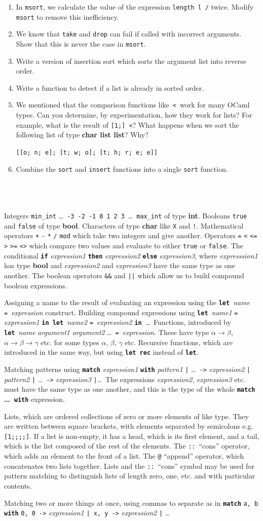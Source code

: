 \documentclass[]{book}
\makeatletter
\newcommand\upquote[1]{\textquotesingle#1\textquotesingle}
\newcommand{\sofarstartingoff}{

\noindent 1

\noindent Integers \texttt{min\_int} \ldots\ \texttt{-3}\ \texttt{-2}\ \texttt{-1}\ \texttt{0}\ \texttt{1}\ \texttt{2}\ \texttt{3}\ \ldots\ \texttt{max\_int} of type \textbf{\textrm{int}}. Booleans \texttt{true} and \texttt{false} of type \textbf{\textrm{bool}}. \noindent Characters of type \textrm{\textbf{char}} like \texttt{\upquote{X}} and \texttt{\upquote{!}}. Mathematical operators \texttt{+} \texttt{-} \texttt{*} \texttt{/} \texttt{mod} which take two integers and give another. Operators \texttt{=} \texttt{<} \texttt{<=} \texttt{>} \texttt{>=} \texttt{<>} which compare two values and evaluate to either \texttt{true} or \texttt{false}. The conditional \textbf{\texttt{if}} \textit{expression1} \textbf{\texttt{then}} \textit{expression2} \textbf{\texttt{else}} \textit{expression3}, where \textit{expresssion1} has type \textrm{\textbf{bool}} and \textit{expression2} and \textit{expression3} have the same type as one another. The boolean operators \texttt{\&\&} and \texttt{||} which allow us to build compound boolean expressions.}
\newcommand{\sofarfunctions}
{
\noindent 2

\noindent Assigning a name to the result of evaluating an expression using the \textbf{\texttt{let}}\ \textit{name} \texttt{=}\ \textit{expression} construct. Building compound expressions using \textbf{\texttt{let}}\ \textit{name1} \texttt{=} \textit{expression1} \textbf{\texttt{in}}\ \textbf{\texttt{let}}\ \textit{name2} \texttt{=}\ \textit{expression2} \textbf{\texttt{in}}\ \ldots \ Functions, introduced by \textbf{\texttt{let}}\ \textit{name} \textit{argument1} \textit{argument2} \ldots\ \texttt{=}\ \textit{expression}. These have type $\alpha \rightarrow \beta$, $\alpha \rightarrow \beta \rightarrow \gamma$ etc. for some types $\alpha$, $\beta$, $\gamma$ etc. Recursive functions, which are introduced in the same way, but using \textbf{\texttt{let rec}} instead of \textbf{\texttt{let}}.}
\newcommand{\sofarcasebycase}
{\noindent 3

\noindent Matching patterns using \textbf{\texttt{match}} \textit{expression1} \textbf{\texttt{with}} \textit{pattern1} \texttt{|} \ldots\ \texttt{->} \textit{expression2} \texttt{|} \textit{pattern2} \texttt{|} \ldots\ \texttt{->} \textit{expression3} \texttt{|}\ldots \ The expressions \textit{expression2}, \textit{expression3} etc. must have the same type as one another, and this is the type of the whole \textbf{\texttt{match} \ldots\ \texttt{with}} expression.}
\newcommand{\sofarlistingthings}
{
\noindent 4

\noindent Lists, which are ordered collections of zero or more elements of like type. They are written between square brackets, with elements separated by semicolons e.g. \texttt{[1;\! 2;\! 3;\! 4;\! 5]}. If a list is non-empty, it has a head, which is its first element, and a tail, which is the list composed of the rest of the elements. The \texttt{::}\ ``cons'' operator, which adds an element to the front of a list. The \texttt{@} ``append'' operator, which concatenates two lists together. Lists and the \texttt{::}\ ``cons'' symbol may be used for pattern matching to distinguish lists of length zero, one, etc. and with particular contents.}
\newcommand{\sofarsortingthings}
{
\noindent 5

\noindent Matching two or more things at once, using commas to separate as in \texttt{\textbf{match}} \texttt{a, b} \textbf{\texttt{with}} \texttt{0, 0 ->} \textit{expression1} \texttt{|\ x, y ->} \textit{expression2} \texttt{|} \ldots
}
\makeatother
\begin{document}
\begin{enumerate}
  \item In \texttt{msort}, we calculate the value of the expression \texttt{length\! l\! /} twice. Modify \texttt{msort} to remove this inefficiency.
  \item We know that \texttt{take} and \texttt{drop} can fail if called with incorrect arguments. Show that this is never the case in \texttt{msort}.
  \item Write a version of insertion sort which sorts the argument list into reverse order.
  \item Write a function to detect if a list is already in sorted order.
  \item We mentioned that the comparison functions like \,\texttt{<}\, work for many OCaml types. Can you determine, by experimentation, how they work for lists? For example, what is the result of \texttt{[1;]\! <\! [2;\! 3]}? What happens when we sort the following list of type \textbf{\textrm{char list list}}? Why?
  
  \vspace{1mm}
  \texttt{\phantom{space}[[\upquote{o}; \upquote{n}; \upquote{e}]; [\upquote{t}; \upquote{w}; \upquote{o}]; [\upquote{t}; \upquote{h}; \upquote{r}; \upquote{e}; \upquote{e}]]}
  
  \item Combine the \texttt{sort} and \texttt{insert} functions into a single \texttt{sort} function.
\end{enumerate}

\cleardoublepage
\thispagestyle{empty}
\chapter*{}
\\

{\footnotesize
\sofarstartingoff

\vspace{\baselineskip}
\sofarfunctions

\vspace{\baselineskip}
\sofarcasebycase

\vspace{\baselineskip}
\sofarlistingthings

\vspace{\baselineskip}
\sofarsortingthings
}
\end{document}
